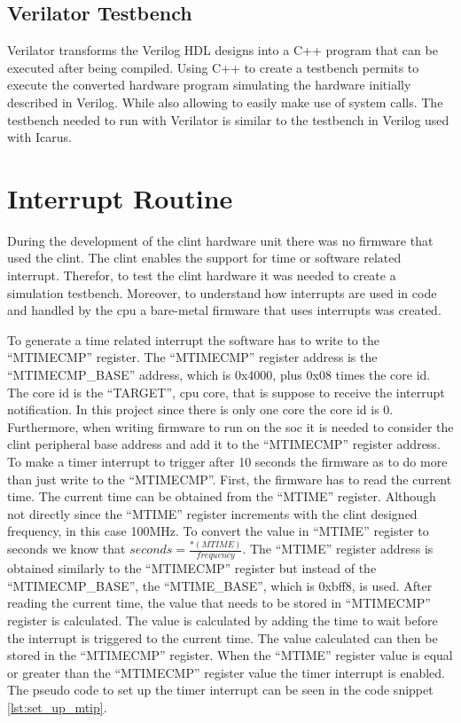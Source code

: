 \subsection{Verilator Testbench}
Verilator transforms the Verilog HDL designs into a C++ program that can be executed after being compiled. Using C++ to create a testbench permits to execute the converted hardware program simulating the hardware initially described in Verilog. While also allowing to easily make use of system calls. The testbench needed to run with Verilator is similar to the testbench in Verilog used with Icarus.

\section{Interrupt Routine}
\label{section:barebones_interrupt_routine}
During the development of the \acrshort{clint} hardware unit there was no firmware that used the \acrshort{clint}. The \acrshort{clint} enables the support for time or software related interrupt. Therefor, to test the \acrshort{clint} hardware it was needed to create a simulation testbench. Moreover, to understand how interrupts are used in code and handled by the \acrshort{cpu} a bare-metal firmware that uses interrupts was created.

To generate a time related interrupt the software has to write to the \enquote{MTIMECMP} register. The \enquote{MTIMECMP} register address is the \enquote{MTIMECMP\_BASE} address, which is 0x4000, plus 0x08 times the core id. The core id is the \enquote{TARGET}, \acrshort{cpu} core, that is suppose to receive the interrupt notification. In this project since there is only one core the core id is 0. Furthermore, when writing firmware to run on the \acrshort{soc} it is needed to consider the \acrshort{clint} peripheral base address and add it to the \enquote{MTIMECMP} register address. To make a timer interrupt to trigger after 10 seconds the firmware as to do more than just write to the \enquote{MTIMECMP}. First, the firmware has to read the current time. The current time can be obtained from the \enquote{MTIME} register. Although not directly since the \enquote{MTIME} register increments with the \acrshort{clint} designed frequency, in this case 100MHz. To convert the value in \enquote{MTIME} register to seconds we know that $seconds=\frac{*(MTIME)}{frequency}$. The \enquote{MTIME} register address is obtained similarly to the \enquote{MTIMECMP} register but instead of the \enquote{MTIMECMP\_BASE}, the \enquote{MTIME\_BASE}, which is 0xbff8, is used. After reading the current time, the value that needs to be stored in \enquote{MTIMECMP} register is calculated. The value is calculated by adding the time to wait before the interrupt is triggered to the current time. The value calculated can then be stored in the \enquote{MTIMECMP} register. When the \enquote{MTIME} register value is equal or greater than the \enquote{MTIMECMP} register value the timer interrupt is enabled. The pseudo code to set up the timer interrupt can be seen in the code snippet \ref*{lst:set_up_mtip}. 

